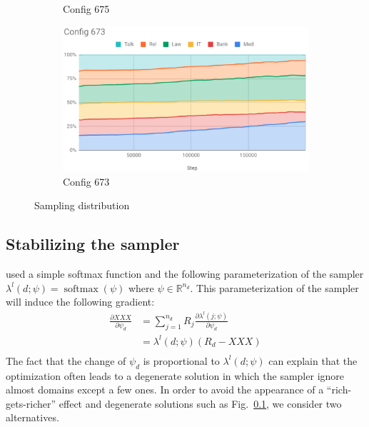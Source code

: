 \documentclass[11pt,a4paper]{article}
\newcommand{\fyTodo}[1]{\Todo[FY:]{\textcolor{orange}{#1}}}
\begin{document}
\begin{figure}[htb]
\begin{subfigure}{.5\textwidth}
  \caption{Config 675}
  \label{fig:675}
\end{subfigure}
\begin{subfigure}{.5\textwidth}
  \centering
  \includegraphics[width=.8\linewidth]{config673.png}  
  \caption{Config 673}
  \label{fig:673}
\end{subfigure}
\caption{Sampling distribution}
\label{fig:sampling}
\end{figure}

\subsection{Stabilizing the sampler \label{ssec:sampler}}

\cite{Wang20balancing} used a simple softmax function and the following parameterization of the sampler $\lambda^l(d;\psi) = \operatorname{softmax}(\psi)$ where $\psi \in \mathbb{R}^{n_d}$. This parameterization of the sampler will induce the following gradient:\fyTodo{Change name of obj. function}
\begin{align*}
\frac{\partial XXX}{\partial \psi_d} & = \displaystyle{\mathop{\sum}_{j=1}^{n_d}} R_j \frac{\partial \lambda^l(j; \psi)}{\partial \psi_d} \\
	& = \lambda^l(d; \psi) (R_d- XXX)\\
\end{align*} 
The fact that the change of $\psi_d$ is proportional to $\lambda^l(d; \psi)$ can explain that the optimization often leads to a degenerate solution in which the sampler ignore almost domains except a few ones. In order to avoid the appearance of a ``rich-gets-richer'' effect and degenerate solutions such as Fig.~\ref{}, we consider two alternatives.
\end{document}
